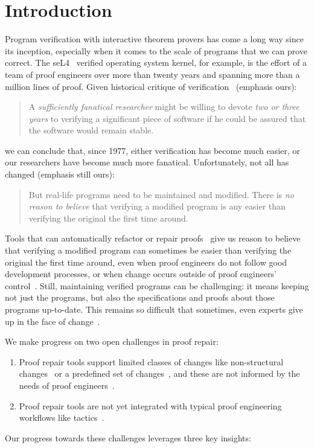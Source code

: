 \section{Introduction}

Program verification with interactive theorem provers has come a long way since its inception,
especially when it comes to the scale of programs that we can prove correct.
The seL4~\cite{Klein2009} verified operating system kernel, for example,
is the effort of a team of proof engineers over more than twenty years and spanning more than
a million lines of proof.
Given historical critique of verification~\cite{DeMillo1977} (emphasis ours):

\begin{quote}
A \textit{sufficiently fanatical researcher}
might be willing to devote \textit{two or 
three years} to verifying a significant 
piece of software if he could be 
assured that the software would remain stable.
\end{quote}
we can conclude that, since 1977, either verification has become much easier,
or our researchers have become much more fanatical. Unfortunately, not all has changed (emphasis still ours):

\begin{quote}
But real-life programs need to 
be maintained and modified. 
There is \textit{no reason to believe} that verifying a modified program is any 
easier than verifying the original the 
first time around.
\end{quote}
Tools that can automatically refactor or repair proofs~\cite{wibergh2019, WhitesidePhD, Dietrich2013, adams2015, Bourke12, Roe2016, robert2018, pumpkinpatch}
give us reason to believe that verifying a modified program can sometimes be easier than verifying the original the first time
around, even when proof engineers do not follow good development processes,
or when change occurs outside of proof engineers' control~\cite{PGL-045}.
Still, maintaining verified programs can be challenging: it means keeping not just the programs, but also the
specifications and proofs about those programs up-to-date.
This remains so difficult that sometimes, even experts give up in the face of change~\cite{replica}.

We make progress on two open challenges in proof repair:

\begin{enumerate}
\item Proof repair tools support limited classes of changes like non-structural changes~\cite{pumpkinpatch} or a predefined set
of changes~\cite{robert2018, wibergh2019}, and these are not informed by the needs of proof engineers~\cite{replica}.
\item Proof repair tools are not yet integrated with typical proof engineering workflows like tactics~\cite{PGL-045, pumpkinpatch, robert2018}.
\end{enumerate}
Our progress towards these challenges leverages three key insights:

